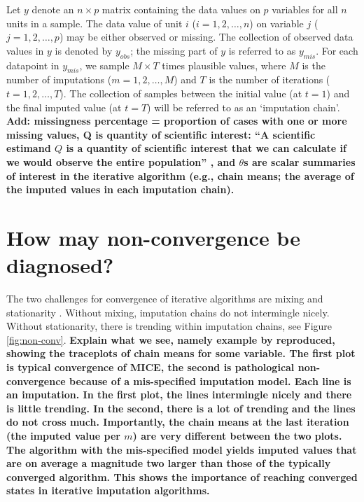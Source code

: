 \documentclass[Royal,times,sageh]{sagej}
\begin{document}
Let \(y\) denote an \(n \times p\) matrix containing the data values on
\(p\) variables for all \(n\) units in a sample. The data value of unit
\(i\) (\(i = 1, 2, \dots, n\)) on variable \(j\)
(\(j = 1, 2, \dots, p\)) may be either observed or missing. The
collection of observed data values in \(y\) is denoted by \(y_{obs}\);
the missing part of \(y\) is referred to as \(y_{mis}\). For each
datapoint in \(y_{mis}\), we sample \(M \times T\) times plausible
values, where \(M\) is the number of imputations
(\(m = 1, 2, \dots, M\)) and \(T\) is the number of iterations
(\(t = 1, 2, \dots, T\)). The collection of samples between the initial
value (at \(t=1\)) and the final imputed value (at \(t=T\)) will be
referred to as an `imputation chain'. \textbf{Add: missingness
percentage = proportion of cases with one or more missing values, Q is
quantity of scientific interest: ``A scientific estimand \(Q\) is a
quantity of scientific interest that we can calculate if we would
observe the entire population'' \citep[par 2.3.1]{buur18}, and
\(\theta\)s are scalar summaries of interest in the iterative algorithm
(e.g., chain means; the average of the imputed values in each imputation
chain). }

\hypertarget{how-may-non-convergence-be-diagnosed}{%
\section{How may non-convergence be
diagnosed?}\label{how-may-non-convergence-be-diagnosed}}

The two challenges for convergence of iterative algorithms are mixing
and stationarity \citep{gelm13}. Without mixing, imputation chains do
not intermingle nicely. Without stationarity, there is trending within
imputation chains, see Figure \ref{fig:non-conv}. \textbf{Explain what
we see, namely example by \citet{buur18} reproduced, showing the
traceplots of chain means for some variable. The first plot is typical
convergence of MICE, the second is pathological non-convergence because
of a mis-specified imputation model. Each line is an imputation. In the
first plot, the lines intermingle nicely and there is little trending.
In the second, there is a lot of trending and the lines do not cross
much. Importantly, the chain means at the last iteration (the imputed
value per \(m\)) are very different between the two plots. The algorithm
with the mis-specified model yields imputed values that are on average a
magnitude two larger than those of the typically converged algorithm.
This shows the importance of reaching converged states in iterative
imputation algorithms.}
\end{document}
